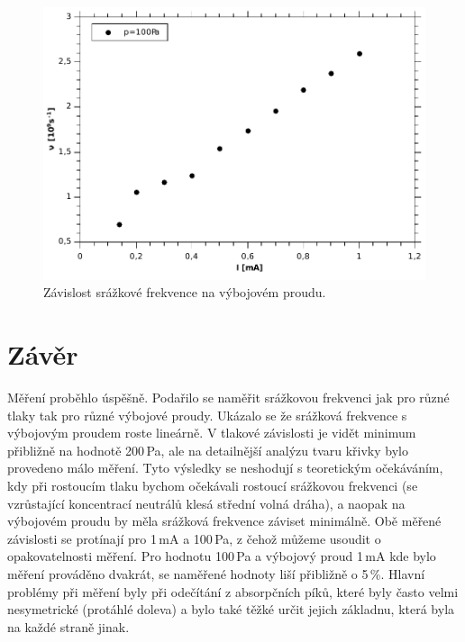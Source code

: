 \documentclass[12pt]{article}
\begin{document}
\begin{figure}[!htbp]
\begin{center}
\includegraphics[width=12cm]{Graph4.pdf}
\caption{Závislost srážkové frekvence na výbojovém proudu.}
\label{vnai}
\end{center}
\end{figure}

\section{Závěr}
Měření proběhlo úspěšně. Podařilo se naměřit srážkovou frekvenci jak pro různé tlaky tak pro různé výbojové proudy. Ukázalo se že srážková frekvence s výbojovým proudem roste lineárně. V tlakové závislosti je vidět minimum přibližně na hodnotě 200\,Pa, ale na detailnější analýzu tvaru křivky bylo provedeno málo měření. Tyto výsledky se neshodují s teoretickým očekáváním, kdy při rostoucím tlaku bychom očekávali rostoucí srážkovou frekvenci (se vzrůstající koncentrací neutrálů klesá střední volná dráha), a naopak na výbojovém proudu by měla srážková frekvence záviset minimálně. Obě měřené závislosti se protínají pro 1\,mA a 100\,Pa, z čehož můžeme usoudit o opakovatelnosti měření. Pro hodnotu 100\,Pa a výbojový proud 1\,mA kde bylo měření prováděno dvakrát, se naměřené hodnoty liší přibližně o 5\,\%. Hlavní problémy při měření byly při odečítání z absorpčních píků, které byly často velmi nesymetrické (protáhlé doleva) a bylo také těžké určit jejich základnu, která byla na každé straně jinak.
\end{document}
